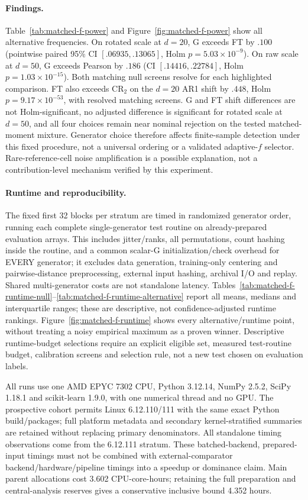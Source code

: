 {\paragraph{Findings.}
Table~\ref{tab:matched-f-power} and Figure~\ref{fig:matched-f-power} show all
alternative frequencies. On rotated scale at $d=20$, G exceeds FT by $.100$
(pointwise paired 95\% CI $[.06935,.13065]$, Holm $p=5.03\times10^{-9}$).
On raw scale at $d=50$, G exceeds Pearson by $.186$
(CI $[.14416,.22784]$, Holm $p=1.03\times10^{-15}$).
Both matching null screens resolve for each highlighted comparison.
FT also exceeds CR$_2$ on the $d=20$ AR1 shift by $.448$, Holm
$p=9.17\times10^{-53}$, with resolved matching screens.
G and FT shift differences are not Holm-significant, no adjusted difference
is significant for rotated scale at $d=50$, and all four choices remain near
nominal rejection on the tested matched-moment mixture.
Generator choice therefore affects finite-sample detection under this fixed
procedure, not a universal ordering or a validated adaptive-$f$ selector.
Rare-reference-cell noise amplification is a possible explanation, not a
contribution-level mechanism verified by this experiment.

\paragraph{Runtime and reproducibility.}
The fixed first 32 blocks per stratum are timed in randomized generator order,
running each complete single-generator test routine on already-prepared
evaluation arrays. This includes jitter/ranks, all permutations, count hashing
inside the routine, and a common scalar-G initialization/check overhead for
EVERY generator; it excludes data generation, training-only centering and
pairwise-distance preprocessing, external input hashing, archival I/O and
replay. Shared multi-generator costs are not standalone latency.
Tables~\ref{tab:matched-f-runtime-null}--\ref{tab:matched-f-runtime-alternative}
report all means, medians and interquartile ranges; these are descriptive,
not confidence-adjusted runtime rankings. Figure~\ref{fig:matched-f-runtime}
shows every alternative/runtime point, without treating a noisy empirical
maximum as a proven winner. Descriptive runtime-budget selections require
an explicit eligible set, measured test-routine budget, calibration screens
and selection rule, not a new test chosen on evaluation labels.

All runs use one AMD EPYC 7302 CPU, Python 3.12.14, NumPy 2.5.2, SciPy 1.18.1
and scikit-learn 1.9.0, with one numerical thread and no GPU. The prospective
cohort permits Linux 6.12.110/111 with the same exact Python build/packages;
full platform metadata and secondary kernel-stratified summaries are retained
without replacing primary denominators. All standalone timing observations
come from the 6.12.111 stratum. These batched-backend, prepared-input timings
must not be combined with external-comparator backend/hardware/pipeline
timings into a speedup or dominance claim. Main parent allocations cost
3.602 CPU-core-hours; retaining the full preparation and central-analysis
reserves gives a conservative inclusive bound 4.352 hours.

}
